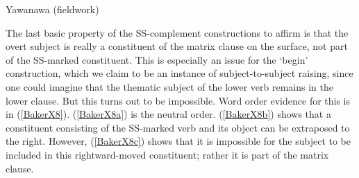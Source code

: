 \documentclass[output=paper]{langscibook}
\begin{document}
\begin{exe}
    \ex Yawanawa (fieldwork) \label{BakerX7}
        \begin{xlist}
        \end{xlist}
\end{exe}

The last basic property of the SS-complement constructions to affirm is that the overt subject is really a constituent of the matrix clause on the surface, not part of the SS-marked constituent. This is especially an issue for the `begin’ construction, which we claim to be an instance of subject-to-subject raising, since one could imagine that the thematic subject of the lower verb remains in the lower clause. But this turns out to be impossible. Word order evidence for this is in (\ref{BakerX8}). (\ref{BakerX8a}) is the neutral order. (\ref{BakerX8b}) shows that a constituent consisting of the SS-marked verb and its object can be extraposed to the right. However, (\ref{BakerX8c}) shows that it is impossible for the subject to be included in this rightward-moved constituent; rather it is part of the matrix clause.
\end{document}
